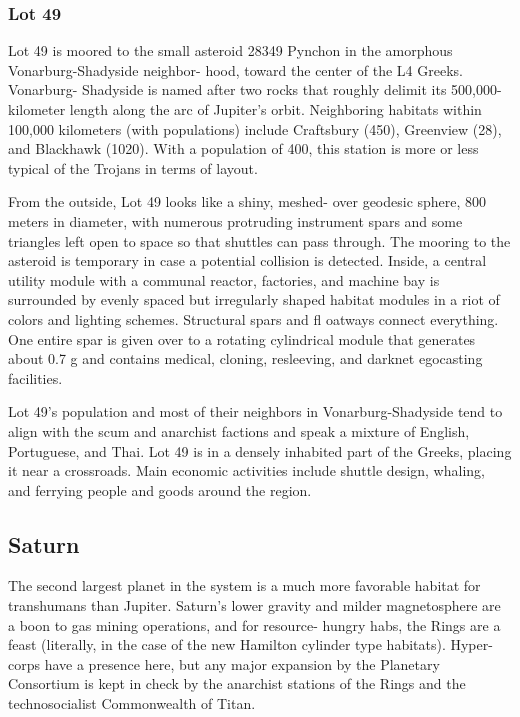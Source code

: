 \subsubsection{Lot 49}

Lot 49 is moored to the small asteroid 28349 Pynchon 
in the amorphous Vonarburg-Shadyside neighbor-
hood, toward the center of the L4 Greeks. Vonarburg-
Shadyside is named after two rocks that roughly 
delimit its 500,000-kilometer length along the arc of 
Jupiter's orbit. Neighboring habitats within 100,000 
kilometers (with populations) include Craftsbury 
(450), Greenview (28), and Blackhawk (1020). With a 
population of 400, this station is more or less typical 
of the Trojans in terms of layout.

From the outside, Lot 49 looks like a shiny, meshed-
over geodesic sphere, 800 meters in diameter, with 
numerous protruding instrument spars and some 
triangles left open to space so that shuttles can pass 
through. The mooring to the asteroid is temporary in 
case a potential collision is detected. Inside, a central 
utility module with a communal reactor, factories, 
and machine bay is surrounded by evenly spaced but 
irregularly shaped habitat modules in a riot of colors 
and lighting schemes. Structural spars and fl oatways 
connect everything. One entire spar is given over to a 
rotating cylindrical module that generates about 0.7 g 
and contains medical, cloning, resleeving, and darknet 
egocasting facilities.

Lot 49's population and most of their neighbors 
in Vonarburg-Shadyside tend to align with the scum 
and anarchist factions and speak a mixture of English, 
Portuguese, and Thai. Lot 49 is in a densely inhabited 
part of the Greeks, placing it near a crossroads. Main 
economic activities include shuttle design, whaling, 
and ferrying people and goods around the region.

\subsection{Saturn}

The second largest planet in the system is a much 
more favorable habitat for transhumans than Jupiter. 
Saturn's lower gravity and milder magnetosphere are 
a boon to gas mining operations, and for resource-
hungry habs, the Rings are a feast (literally, in the case 
of the new Hamilton cylinder type habitats). Hyper-
corps have a presence here, but any major expansion 
by the Planetary Consortium is kept in check by the 
anarchist stations of the Rings and the technosocialist 
Commonwealth of Titan.

